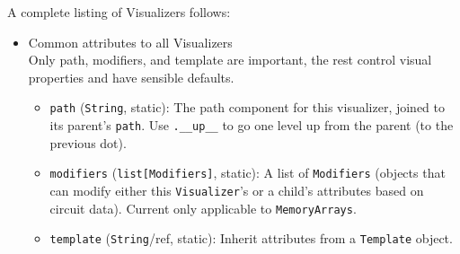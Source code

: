\documentclass[11pt]{article}
\begin{document}
A complete listing of Visualizers follows:
\begin{itemize}
  \item Common attributes to all Visualizers \\
  Only path, modifiers, and template are important, the rest control visual properties and have sensible defaults.
  \begin{itemize}
    \item \texttt{path} (\texttt{String}, static): The path component for this visualizer, joined to its parent's \texttt{path}. Use \texttt{.\_\_up\_\_} to go one level up from the parent (to the previous dot).
    \item \texttt{modifiers} (\texttt{list[Modifiers]}, static): A list of \texttt{Modifiers} (objects that can modify either this \texttt{Visualizer}'s or a child's attributes based on circuit data). Current only applicable to \texttt{MemoryArrays}.
    \item \texttt{template} (\texttt{String}/ref, static): Inherit attributes from a \texttt{Template} object.
    

\end{itemize}
\end{itemize}
\end{document}
